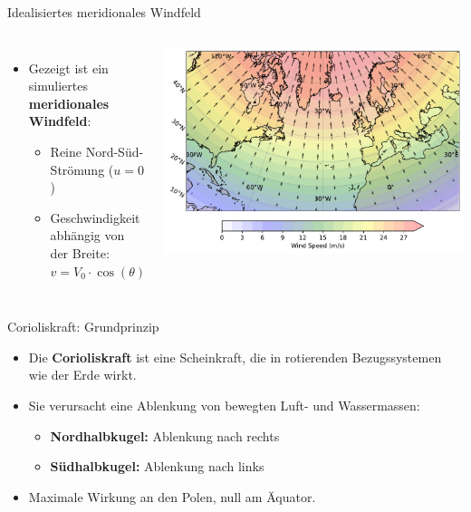 \begin{frame}{Idealisiertes meridionales Windfeld}
	\begin{columns}
		\begin{itemize}
			\item Gezeigt ist ein simuliertes \textbf{meridionales Windfeld}:
			      \begin{itemize}
				      \item Reine Nord-Süd-Strömung (\(u = 0\))
				      \item Geschwindigkeit abhängig von der Breite: \(v = V_0 \cdot \cos(\theta)\)
			      \end{itemize}
		\end{itemize}


		\includegraphics[width=\linewidth]{../images/meridional_wind_plot.pdf}

	\end{columns}
\end{frame}



\begin{frame}{Corioliskraft: Grundprinzip}
	\begin{itemize}
		\item Die \textbf{Corioliskraft} ist eine Scheinkraft, die in rotierenden Bezugssystemen wie der Erde wirkt.
		\item Sie verursacht eine Ablenkung von bewegten Luft- und Wassermassen:
		      \begin{itemize}
			      \item \textbf{Nordhalbkugel:} Ablenkung nach rechts
			      \item \textbf{Südhalbkugel:} Ablenkung nach links
		      \end{itemize}
		\item Maximale Wirkung an den Polen, null am Äquator.
	\end{itemize}
\end{frame}

